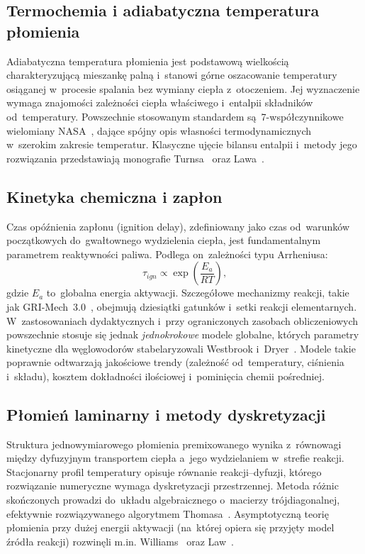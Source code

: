 \documentclass[11pt,a4paper]{article}
\begin{document}
\subsection{Termochemia i adiabatyczna temperatura płomienia}
Adiabatyczna temperatura płomienia jest podstawową wielkością charakteryzującą
mieszankę palną i~stanowi górne oszacowanie temperatury osiąganej w~procesie
spalania bez wymiany ciepła z~otoczeniem. Jej wyznaczenie wymaga znajomości
zależności ciepła właściwego i~entalpii składników od~temperatury. Powszechnie
stosowanym standardem są~7-współczynnikowe wielomiany NASA~\cite{nasa}, dające
spójny opis własności termodynamicznych w~szerokim zakresie temperatur. Klasyczne
ujęcie bilansu entalpii i~metody jego rozwiązania przedstawiają monografie
Turnsa~\cite{turns} oraz Lawa~\cite{law}.

\subsection{Kinetyka chemiczna i zapłon}
Czas opóźnienia zapłonu (ignition delay), zdefiniowany jako czas od~warunków
początkowych do~gwałtownego wydzielenia ciepła, jest fundamentalnym parametrem
reaktywności paliwa. Podlega on~zależności typu Arrheniusa:
\begin{equation}
  \tau_{ign} \propto \exp\!\left(\frac{E_a}{R T}\right),
  \label{eq:arrhenius}
\end{equation}
gdzie $E_a$ to~globalna energia aktywacji. Szczegółowe mechanizmy reakcji, takie
jak GRI-Mech~3.0~\cite{grimech}, obejmują dziesiątki gatunków i~setki reakcji
elementarnych. W~zastosowaniach dydaktycznych i~przy ograniczonych zasobach
obliczeniowych powszechnie stosuje się jednak \emph{jednokrokowe} modele globalne,
których parametry kinetyczne dla węglowodorów stabelaryzowali Westbrook
i~Dryer~\cite{westbrook}. Modele takie poprawnie odtwarzają jakościowe trendy
(zależność od~temperatury, ciśnienia i~składu), kosztem dokładności ilościowej
i~pominięcia chemii pośredniej.

\subsection{Płomień laminarny i metody dyskretyzacji}
Struktura jednowymiarowego płomienia premixowanego wynika z~równowagi między
dyfuzyjnym transportem ciepła a~jego wydzielaniem w~strefie reakcji. Stacjonarny
profil temperatury opisuje równanie reakcji--dyfuzji, którego rozwiązanie
numeryczne wymaga dyskretyzacji przestrzennej. Metoda różnic skończonych prowadzi
do~układu algebraicznego o~macierzy trójdiagonalnej, efektywnie rozwiązywanego
algorytmem Thomasa~\cite{press}. Asymptotyczną teorię płomienia przy dużej energii
aktywacji (na~której opiera się przyjęty model źródła reakcji) rozwinęli m.in.
Williams~\cite{williams} oraz Law~\cite{law}.
\end{document}
